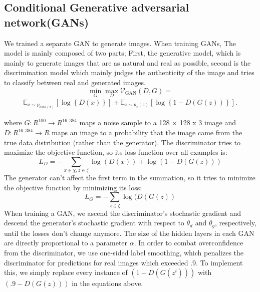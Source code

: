 \documentclass[conference]{IEEEtran}
\begin{document}
\subsection{Conditional Generative adversarial network(GANs)}%

We trained a separate GAN to generate images. When training GANs, The model is mainly composed of two parts; First, the generative model, which is mainly to generate images that are as natural and real as possible, second is the discrimination model which mainly judges the authenticity of the image and tries to classify between real and generated images.
\begin{equation}
\min_{G}\max_{D}\mathcal V_{\text{GAN}}\left(D, G \right) = \end{equation}
\begin{align*}
 \mathbb E_{x \sim p_{\text{data}\left( x\right) }}\left[ \log \left\{ D\left( x \right) \right\} \right] + \mathbb E_{z\sim p_{z}\left( z\right)}\left[ \log\left\{ 1 - D\left( G\left( z\right) \right) \right\}\right].   
\end{align*}

where \begin{math}G : R^{100} \longrightarrow R^{16,384}\end{math} maps a noise sample to a 128 × 128 x 3 image and \begin{math}D : R^{16,384} \longrightarrow R\end{math} maps an image to a probability that the image came from the true data distribution (rather than the generator). The discriminator tries to maximize the objective function, so its loss function over all examples is:
\begin{equation}
L_D = - \sum_{x \in \chi, z \in \zeta} \log(D(x)) + \log(1 - D(G(z))) \tag{6}
\end{equation}
The generator can’t affect the first term in the summation, so it tries to minimize the objective function by minimizing its loss:
\begin{equation}
L_G = - \sum_{z \in \zeta} \log(D(G(z)) \tag{7}
\end{equation}
When training a GAN, we ascend the discriminator’s stochastic gradient and descend the generator’s stochastic gradient with respect to \begin{math}\theta_{d}\end{math} and \begin{math}\theta_g\end{math}, respectively, until the losses don’t change anymore. The size of the hidden layers in each GAN are directly proportional to a parameter \begin{math}\alpha\end{math}. In order to combat overconfidence from the discriminator, we use one-sided label smoothing, which penalizes the discriminator for predictions for real images which exceeded .9. To implement this, we simply replace every instance of \begin{math}(1 - D (G (z^i)))\end{math} with \begin{math}(.9 - D (G (z)))\end{math} in the equations above.
\end{document}
